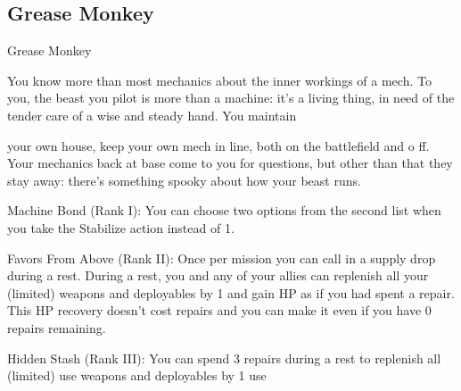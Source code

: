 \subsection{Grease Monkey}

                                              Grease Monkey

You know more than most mechanics about the inner workings of a mech. To you, the beast you pilot is
more than a machine: it’s a living thing, in need of the tender care of a wise and steady hand. You maintain




your own house, keep your own mech in line, both on the battlefield and o ff. Your mechanics back at base
come to you for questions, but other than that they stay away: there’s something spooky about how your
beast runs.

Machine Bond (Rank I): You can choose two options from the second list when you take the
Stabilize action instead of 1.

Favors From Above (Rank II): Once per mission you can call in a supply drop during a rest.
During a rest, you and any of your allies can replenish all your (limited) weapons and deployables
by 1 and gain HP as if you had spent a repair. This HP recovery doesn’t cost repairs and you can
make it even if you have 0 repairs remaining.

Hidden Stash (Rank III): You can spend 3 repairs during a rest to replenish all (limited) use
weapons and deployables by 1 use